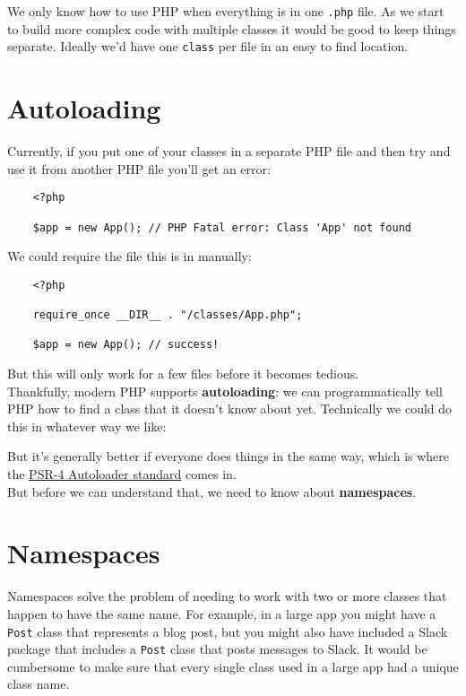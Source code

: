 We only know how to use PHP when everything is in one \texttt{.php} file. As we start to build more complex code with multiple classes it would be good to keep things separate. Ideally we'd have one \texttt{class} per file in an easy to find location.


\section{Autoloading}

Currently, if you put one of your classes in a separate PHP file and then try and use it from another PHP file you'll get an error:

\begin{verbatim}
    <?php

    $app = new App(); // PHP Fatal error: Class 'App' not found
\end{verbatim}

We could require the file this is in manually:

\begin{verbatim}
    <?php

    require_once __DIR__ . "/classes/App.php";

    $app = new App(); // success!
\end{verbatim}

But this will only work for a few files before it becomes tedious.
\\

Thankfully, modern PHP supports \textbf{autoloading}: we can programmatically tell PHP how to find a class that it doesn't know about yet. Technically we could do this in whatever way we like:


But it's generally better if everyone does things in the same way, which is where the \href{https://www.php-fig.org/psr/psr-4/}{PSR-4 Autoloader standard} comes in.
\\

But before we can understand that, we need to know about \textbf{namespaces}.


\section{Namespaces}

Namespaces solve the problem of needing to work with two or more classes that happen to have the same name. For example, in a large app you might have a \texttt{Post} class that represents a blog post, but you might also have included a Slack package that includes a \texttt{Post} class that posts messages to Slack. It would be cumbersome to make sure that every single class used in a large app had a unique class name.
\\

